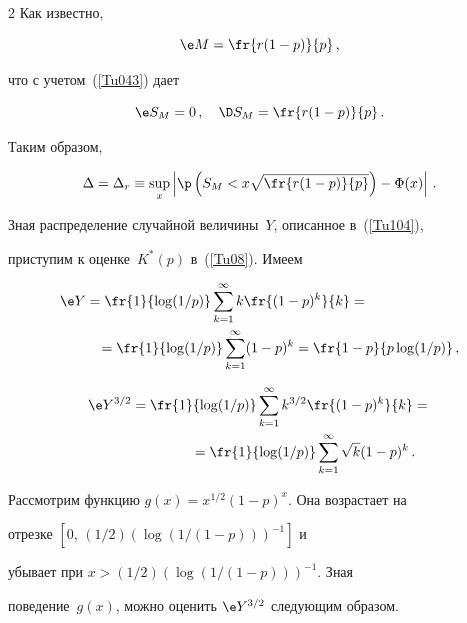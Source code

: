 \begin{multicols}{2}
Как известно,


$$


\e M =  \fr{r(1-p)}{p}\,,


$$


что с учетом~(\ref{Tu043}) дает


$$


\e S_M =0\,,  \quad \D S_M = \fr{r(1-p)}{p}\,.


$$


Таким образом,


$$


\Delta  = \Delta_r \equiv \sup\limits_{x}\left|\p\left({


S}_{M}<x\sqrt{\fr{r(1-p)}{p}}\right)-\Phi(x)\right|\,.


$$





Зная распределение случайной величины~$Y$, описанное в~(\ref{Tu104}), 


приступим к оценке~$K^*(p)$ в~(\ref{Tu08}). Имеем


\begin{align*}


\e Y&=\fr{1}{\log(1/p)}\sum\limits_{k=1}^\infty k\fr{(1-p)^k}{k}={}\\


&\hspace*{3mm}{}=


\fr{1}{\log({1}/{p})}\sum\limits_{k=1}^\infty(1-p)^k=\fr{1-p}{p\log({1}/{p})}\,,


\end{align*}


\begin{align*}


\e Y^{3/2}&=\fr{1}{\log({1}/{p})}\sum\limits_{k=1}^\infty k^{3/2} \fr{(1-p)^k}{k}={}\\


&\hspace*{15mm}{}=


\fr{1}{\log({1}/{p})}\sum\limits_{k=1}^\infty \sqrt{k}


(1-p)^k\,.


\end{align*}


Рассмотрим функцию $g(x) = x^{1/2}(1-p)^x.$ Она возрастает на


отрезке $\left[0,\, (1/2)(\log (1/(1-p)))^{-1}\right]$ и


убывает при $x > (1/2)\left(\log(1/(1-p))\right)^{-1}$. Зная


поведение~$g(x)$, можно оценить $\e Y^{3/2}$ следующим образом.



\end{multicols}
